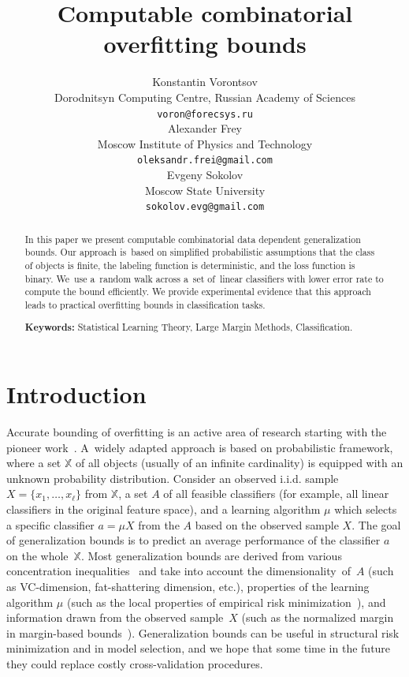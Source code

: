 \documentclass{article} %
\title{Computable combinatorial overfitting bounds}
\author{
Konstantin Vorontsov \\
Dorodnitsyn Computing Centre, Russian Academy of Sciences \\
\texttt{voron@forecsys.ru} \\
\And
Alexander Frey \\
Moscow Institute of Physics and Technology \\
\texttt{oleksandr.frei@gmail.com} \\
\And
Evgeny Sokolov \\
Moscow State University \\
\texttt{sokolov.evg@gmail.com} \\
}
\def\XX{\mathbb{X}}
\begin{document}
\maketitle

\begin{abstract}
In this paper we present computable combinatorial data dependent generalization bounds.
Our approach is~based on simplified probabilistic assumptions that
the class of objects is finite, the labeling function is deterministic, and the loss function is binary.
We~use a~random walk across a~set of~linear classifiers with lower error rate to compute the bound efficiently.
We provide experimental evidence that this approach leads to practical overfitting bounds in classification tasks.

\textbf{Keywords:} Statistical Learning Theory, Large Margin Methods, Classification.
\end{abstract}

\section{Introduction}

Accurate bounding of overfitting is an active area of research starting with the pioneer work~\cite{vapnik71convergence}.
A~widely adapted approach is based on probabilistic framework,
where a set $\XX$ of all objects (usually of an infinite cardinality)
is equipped with an unknown probability distribution.
Consider an observed i.i.d. sample $X = \{x_1, \dots, x_\ell\}$ from $\XX$,
a set $A$ of all feasible classifiers (for example, all linear classifiers in the original feature space),
and a learning algorithm $\mu$ which selects a specific classifier $a = \mu X$ from the $A$ based on the observed sample $X$.
The goal of generalization bounds is to predict an average performance of the classifier $a$ on the whole~$\XX$.
Most generalization bounds are derived from various concentration inequalities~\cite{lugosi03concentration}
and take into account the dimensionality~of~$A$
(such as VC-dimension, fat-shattering dimension, etc.),
properties of the learning algorithm $\mu$
(such as the local properties of empirical risk minimization~\cite{koltchinskii06rademacher}),
and information drawn from the observed sample~$X$
(such as the normalized margin in margin-based bounds~\cite{koltchinskii02margin, koltchinskii03convex}).
Generalization bounds can be useful in structural risk minimization and in model selection,
and we hope that some time in the future they could replace costly cross-validation procedures.
\end{document}
